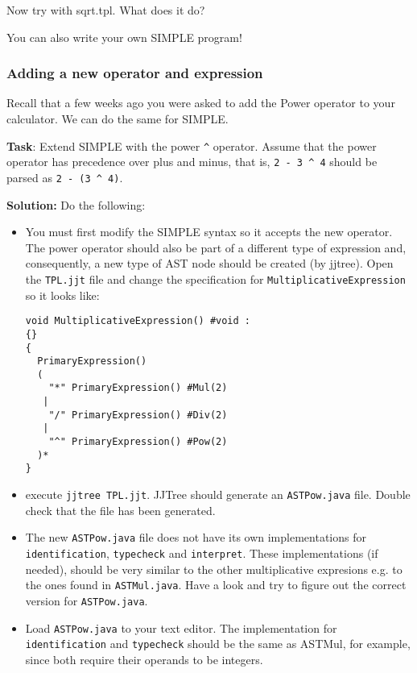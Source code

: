 \documentclass{article}
\begin{document}
Now try with sqrt.tpl. What does it do?

You can also write your own SIMPLE program!

\subsubsection*{Adding a new operator and expression}

Recall that a few weeks ago you were asked to add the Power operator to your calculator. We can do the same for SIMPLE.

\textbf{Task}: Extend SIMPLE with the power \verb+^+ operator. Assume that the power operator has precedence over plus and minus, that is, \verb+2 - 3 ^ 4+ should be parsed as \verb+2 - (3 ^ 4)+.

\textbf{Solution:} Do the following:
\begin{itemize}
\item You must first modify the SIMPLE syntax so it accepts the new operator. The power operator should also be part of a different type of expression and, consequently, a new type of AST node should be created (by jjtree). Open the {\tt TPL.jjt} file and change the specification for {\tt MultiplicativeExpression} so it looks like:

\begin{verbatim}
void MultiplicativeExpression() #void :
{}
{
  PrimaryExpression()
  (
    "*" PrimaryExpression() #Mul(2)
   |
    "/" PrimaryExpression() #Div(2)
   | 
    "^" PrimaryExpression() #Pow(2)
  )*
}
\end{verbatim}

\item execute {\tt jjtree TPL.jjt}. JJTree should generate an {\tt ASTPow.java} file. Double check that the file has been generated.

\item The new {\tt ASTPow.java} file does not have its own implementations for {\tt identification}, {\tt typecheck} and {\tt interpret}. These implementations (if needed), should be very similar to the other multiplicative expresions e.g. to the ones found in {\tt ASTMul.java}. Have a look and try to figure out the correct version for {\tt ASTPow.java}.

\item Load {\tt ASTPow.java} to your text editor. The implementation for {\tt identification} and {\tt typecheck} should be the same as ASTMul, for example, since both require their operands to be integers. 


\end{itemize}
\end{document}
